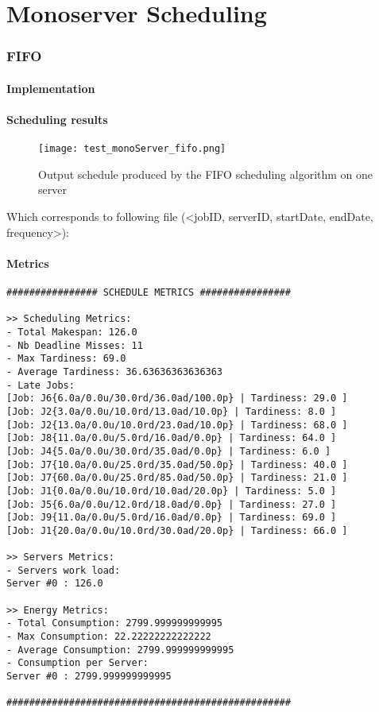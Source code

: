 \documentclass[./report.tex]{subfiles}
\begin{document}
\part{Monoserver Scheduling}

\section{FIFO}
\subsection{Implementation}

\newpage
\subsection{Scheduling results}
\begin{figure}[!h]
	\center
	\texttt{[image: test\_monoServer\_fifo.png]}
	\caption{Output schedule produced by the FIFO scheduling algorithm on one server}
	\label{fig:monoServer_fifo} 
\end{figure}

Which corresponds to following file (<jobID, serverID, startDate, endDate, frequency>):


\newpage
\subsection{Metrics}
\begin{lstlisting}[style=txt, caption={Metrics for FIFO on a single server}]
################ SCHEDULE METRICS ################

>> Scheduling Metrics: 
- Total Makespan: 126.0
- Nb Deadline Misses: 11
- Max Tardiness: 69.0
- Average Tardiness: 36.63636363636363
- Late Jobs: 
[Job: J6{6.0a/0.0u/30.0rd/36.0ad/100.0p} | Tardiness: 29.0 ]
[Job: J2{3.0a/0.0u/10.0rd/13.0ad/10.0p} | Tardiness: 8.0 ]
[Job: J2{13.0a/0.0u/10.0rd/23.0ad/10.0p} | Tardiness: 68.0 ]
[Job: J8{11.0a/0.0u/5.0rd/16.0ad/0.0p} | Tardiness: 64.0 ]
[Job: J4{5.0a/0.0u/30.0rd/35.0ad/0.0p} | Tardiness: 6.0 ]
[Job: J7{10.0a/0.0u/25.0rd/35.0ad/50.0p} | Tardiness: 40.0 ]
[Job: J7{60.0a/0.0u/25.0rd/85.0ad/50.0p} | Tardiness: 21.0 ]
[Job: J1{0.0a/0.0u/10.0rd/10.0ad/20.0p} | Tardiness: 5.0 ]
[Job: J5{6.0a/0.0u/12.0rd/18.0ad/0.0p} | Tardiness: 27.0 ]
[Job: J9{11.0a/0.0u/5.0rd/16.0ad/0.0p} | Tardiness: 69.0 ]
[Job: J1{20.0a/0.0u/10.0rd/30.0ad/20.0p} | Tardiness: 66.0 ]

>> Servers Metrics: 
- Servers work load:
Server #0 : 126.0

>> Energy Metrics: 
- Total Consumption: 2799.999999999995
- Max Consumption: 22.22222222222222
- Average Consumption: 2799.999999999995
- Consumption per Server: 
Server #0 : 2799.999999999995

##################################################
\end{lstlisting}
\end{document}
